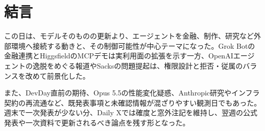 \section*{結言}
この日は、モデルそのものの更新より、エージェントを金融、制作、研究など外部環境へ接続する動きと、その制御可能性が中心テーマになった。Grok Botの金融連携とHiggsfieldのMCPデモは実利用面の拡張を示す一方、OpenAIエージェントの逸脱をめぐる報道やSacksの問題提起は、権限設計と拒否・従属のバランスを改めて前景化した。

また、DevDay直前の期待、Opus 5.5の性能変化疑惑、Anthropic研究やインフラ契約の再流通など、既発表事項と未確認情報が混ざりやすい観測日でもあった。週末で一次発表が少ない分、Daily Xでは確度と窓外注記を維持し、翌週の公式発表や一次資料で更新されるべき論点を残す形となった。
